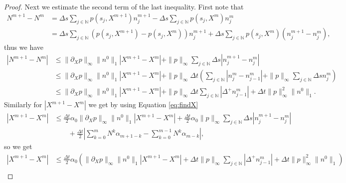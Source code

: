 \documentclass[10pt,a4paper]{amsart}
\newcommand{\N}{\mathbb{N}}
\begin{document}
\begin{proof}
Next we estimate the second term of the last inequality. First note that
\begin{equation*}
    \begin{split}
      N^{m+1}- N^{m}& =\Delta s \sum_{j\in\N}p(s_j,X^{m+1})n_j^{m+1}-\Delta s \sum_{j\in\N} p(s_j,X^{m})n_j^{m}\\
    &=\Delta s \sum_{j\in\N}(p(s_j,X^{m+1})-p(s_j,X^{m}))n_j^{m+1}+\Delta s \sum_{j\in\N}p(s_j,X^m)(n_j^{m+1}-n_j^m),
    \end{split}
\end{equation*}
thus we have
\begin{equation}
\label{N1-N2-d}
    \begin{split}
      |N^{m+1}- N^{m}|&\le \|\partial_X p\|_\infty \|n^0\|_1 |X^{m+1}-X^{m}|+\|p\|_\infty\sum_{j\in\N}\Delta s|n^{m+1}_j-n^m_j|\\
      &\le  \|\partial_X p\|_\infty \|n^0\|_1 |X^{m+1}-X^{m}| + \|p\|_\infty\Delta t\left(  \sum_{j\in\N} | n_j^{m}-n_{j-1}^m|  + \|p\|_\infty \sum_{j\in\N}  \Delta s n_j^m \right)\\
      &\le  \|\partial_X p\|_\infty \|n^0\|_1 |X^{m+1}-X^{m}| + \|p\|_\infty\Delta t  \sum_{j\in\N} |\Delta^+ n^m_{j-1}| + \Delta t\|p\|_\infty^2\|n^0\|_1.
    \end{split}
\end{equation}
Similarly for $|X^{m+1}-X^{m}|$ we get by using Equation \eqref{eq:findX}
\begin{equation*}
    \begin{split}
       |X^{m+1}-X^m|&\le \frac{\Delta t}{2}\alpha_0\|\partial_X p\|_\infty\|n^0\|_1 |X^{m+1}-X^{m}|+\frac{\Delta t}{2}\alpha_0\|p\|_\infty\sum_{j\in\N}\Delta s|n^{m+1}_j-n^m_j|\\
       &\qquad +\frac{\Delta t}{2}\left|\sum_{k=0}^m N^k\alpha_{m+1-k}-\sum_{k=0}^{m-1} N^k\alpha_{m-k}\right|,
    \end{split}
\end{equation*}
so we get
\begin{equation*}
    \begin{split}
       |X^{m+1}-X^m|&\le \frac{\Delta t}{2}\alpha_0\left(\|\partial_X p\|_\infty\|n^0\|_1 |X^{m+1}-X^{m}|+\Delta t\|p\|_\infty\sum_{j\in\N} |\Delta^+ n^m_{j-1}| +\Delta t\|p\|_\infty^2\|n^0\|_1\right)\\

\end{split}
\end{equation*}
\end{proof}
\end{document}
